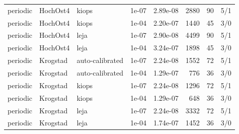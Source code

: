 \begin{table}[p]
\begin{tabular}{@{}llllrrrc@{}}
periodic & HochOst4 & kiops & 1e-07 & 2.89e-08 & 2880 & 90 & 5/1\\
periodic & HochOst4 & kiops & 1e-04 & 2.20e-07 & 1440 & 45 & 3/0\\
periodic & HochOst4 & leja & 1e-07 & 2.90e-08 & 4499 & 90 & 5/1\\
periodic & HochOst4 & leja & 1e-04 & 3.24e-07 & 1898 & 45 & 3/0\\
periodic & Krogstad & auto-calibrated & 1e-07 & 2.24e-08 & 1552 & 72 & 5/1\\
periodic & Krogstad & auto-calibrated & 1e-04 & 1.29e-07 & 776 & 36 & 3/0\\
periodic & Krogstad & kiops & 1e-07 & 2.24e-08 & 1296 & 72 & 5/1\\
periodic & Krogstad & kiops & 1e-04 & 1.29e-07 & 648 & 36 & 3/0\\
periodic & Krogstad & leja & 1e-07 & 2.24e-08 & 3332 & 72 & 5/1\\
periodic & Krogstad & leja & 1e-04 & 1.74e-07 & 1452 & 36 & 3/0\\
\bottomrule
\end{tabular}
\end{table}
